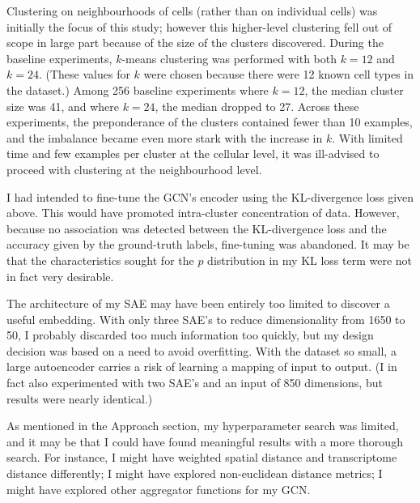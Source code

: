 \documentclass{article}
\begin{document}
Clustering on neighbourhoods of cells (rather than on individual cells) was initially the focus of this study; however this higher-level clustering fell out of scope in large part because of the size of the clusters discovered. During the baseline experiments, $k$-means clustering was performed with both $k=12$ and $k=24$. (These values for $k$ were chosen because there were 12 known cell types in the dataset.) Among 256 baseline experiments where $k = 12$, the median cluster size was 41, and where $k = 24$, the median dropped to 27. Across these experiments, the preponderance of the clusters contained fewer than 10 examples, and the imbalance became even more stark with the increase in $k$. With limited time and few examples per cluster at the cellular level, it was ill-advised to proceed with clustering at the neighbourhood level.

I had intended to fine-tune the GCN's encoder using the KL-divergence loss given above. This would have promoted intra-cluster concentration of data. However, because no association was detected between the KL-divergence loss and the accuracy given by the ground-truth labels, fine-tuning was abandoned. It may be that the characteristics sought for the $p$ distribution in my KL loss term were not in fact very desirable.

The architecture of my SAE may have been entirely too limited to discover a useful embedding. With only three SAE's to reduce dimensionality from 1650 to 50, I probably discarded too much information too quickly, but my design decision was based on a need to avoid overfitting. With the dataset so small, a large autoencoder carries a risk of learning a mapping of input to output. (I in fact also experimented with two SAE's and an input of 850 dimensions, but results were nearly identical.)

As mentioned in the Approach section, my hyperparameter search was limited, and it may be that I could have found meaningful results with a more thorough search. For instance, I might have weighted spatial distance and transcriptome distance differently; I might have explored non-euclidean distance metrics; I might have explored other aggregator functions for my GCN.



\end{document}

